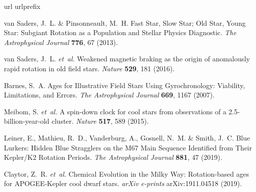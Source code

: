 \begin{thebibliography}{10}
\expandafter\ifx\csname url\endcsname\relax
  \def\url#1{\texttt{#1}}\fi
\expandafter\ifx\csname urlprefix\endcsname\relax\def\urlprefix{URL }\fi
\providecommand{\bibinfo}[2]{#2}
\providecommand{\eprint}[2][]{\url{#2}}

\bibinfo{author}{{van Saders}, J.~L.} \& \bibinfo{author}{Pinsonneault, M.~H.}
\newblock \bibinfo{title}{Fast {{Star}}, {{Slow Star}}; {{Old Star}}, {{Young
  Star}}: {{Subgiant Rotation}} as a {{Population}} and {{Stellar Physics
  Diagnostic}}}.
\newblock \emph{\bibinfo{journal}{The Astrophysical Journal}}
  \textbf{\bibinfo{volume}{776}}, \bibinfo{pages}{67} (\bibinfo{year}{2013}).

\bibinfo{author}{{van Saders}, J.~L.} \emph{et~al.}
\newblock \bibinfo{title}{Weakened magnetic braking as the origin of
  anomalously rapid rotation in old field stars}.
\newblock \emph{\bibinfo{journal}{Nature}} \textbf{\bibinfo{volume}{529}},
  \bibinfo{pages}{181} (\bibinfo{year}{2016}).

\bibinfo{author}{Barnes, S.~A.}
\newblock \bibinfo{title}{Ages for {{Illustrative Field Stars Using
  Gyrochronology}}: {{Viability}}, {{Limitations}}, and {{Errors}}}.
\newblock \emph{\bibinfo{journal}{The Astrophysical Journal}}
  \textbf{\bibinfo{volume}{669}}, \bibinfo{pages}{1167} (\bibinfo{year}{2007}).

\bibinfo{author}{Meibom, S.} \emph{et~al.}
\newblock \bibinfo{title}{A spin-down clock for cool stars from observations of
  a 2.5-billion-year-old cluster}.
\newblock \emph{\bibinfo{journal}{Nature}} \textbf{\bibinfo{volume}{517}},
  \bibinfo{pages}{589} (\bibinfo{year}{2015}).

\bibinfo{author}{Leiner, E.}, \bibinfo{author}{Mathieu, R.~D.},
  \bibinfo{author}{Vanderburg, A.}, \bibinfo{author}{Gosnell, N.~M.} \&
  \bibinfo{author}{Smith, J.~C.}
\newblock \bibinfo{title}{Blue {{Lurkers}}: {{Hidden Blue Stragglers}} on the
  {{M67 Main Sequence Identified}} from {{Their Kepler}}/{{K2 Rotation
  Periods}}}.
\newblock \emph{\bibinfo{journal}{The Astrophysical Journal}}
  \textbf{\bibinfo{volume}{881}}, \bibinfo{pages}{47} (\bibinfo{year}{2019}).

\bibinfo{author}{Claytor, Z.~R.} \emph{et~al.}
\newblock \bibinfo{title}{Chemical {{Evolution}} in the {{Milky Way}}:
  {{Rotation}}-based ages for {{APOGEE}}-{{Kepler}} cool dwarf stars}.
\newblock \emph{\bibinfo{journal}{arXiv e-prints}}
  \bibinfo{pages}{arXiv:1911.04518} (\bibinfo{year}{2019}).


\end{thebibliography}
